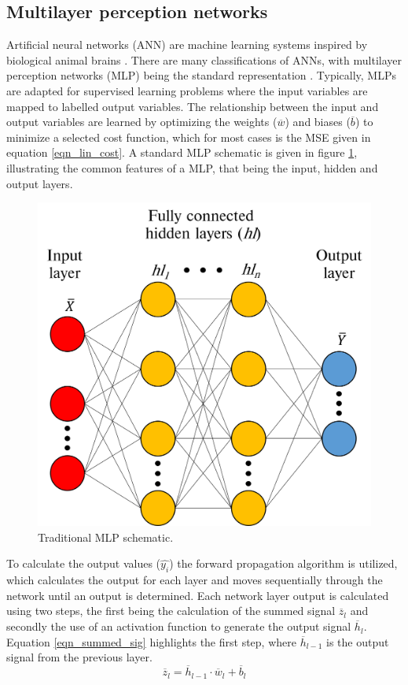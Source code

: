 \documentclass[a4paper,fleqn]{cas-dc}
\begin{document}
\subsection{Multilayer perception networks}
Artificial neural networks (ANN) are machine learning systems inspired by biological animal brains \cite{Rasmussen2006}. There are many classifications of ANNs, with multilayer perception networks (MLP) being the standard representation \citep{goodfellow}. Typically, MLPs are adapted for supervised learning problems where the input variables are mapped to labelled output variables. The relationship between the input and output variables are learned by optimizing the weights ($\overline{w}$) and biases ($\overline{b}$) to minimize a selected cost function, which for most cases is the MSE given in equation \ref{eqn_lin_cost}. A standard MLP schematic is given in figure \ref{fig_mlp_schematic}, illustrating the common features of a MLP, that being the input, hidden and output layers.\\
\begin{figure}[h!]
	\centering
		\includegraphics[scale=0.5]{ML_SCHEMATIC}
	  \caption{Traditional MLP schematic.}\label{fig_mlp_schematic}
\end{figure}

To calculate the output values ($\hat{y_i}$) the forward propagation algorithm is utilized, which calculates the output for each layer and moves sequentially through the network until an output is determined. Each network layer output is calculated using two steps, the first being the calculation of the summed signal $\overline{z}_l$ and secondly the use of an activation function to generate the output signal $\overline{h}_l$. Equation \ref{eqn_summed_sig} highlights the first step, where $\overline{h}_{l-1}$ is the output signal from the previous layer.
\begin{equation}\label{eqn_summed_sig}
\overline{z}_l = \overline{h}_{l-1}\cdot\overline{w}_l+\overline{b}_l
\end{equation}
\end{document}
